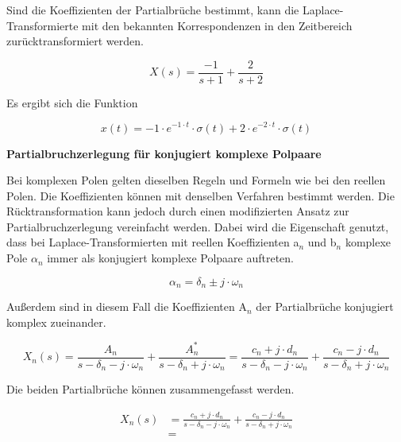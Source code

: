 \noindent Sind die Koeffizienten der Partialbrüche bestimmt, kann die Laplace-Transformierte mit den bekannten Korrespondenzen in den Zeitbereich zurücktransformiert werden.

\begin{equation}\label{eq:fourhundredstwentyseven}
X\left(s\right)=\frac{-1}{s+1} +\frac{2}{s+2} 
\end{equation}

\noindent Es ergibt sich die Funktion

\begin{equation}\label{eq:fourhundredstwentyeight}
x\left(t\right)=-1\cdot e^{-1\cdot t} \cdot \sigma \left(t\right)+2\cdot e^{-2\cdot t} \cdot \sigma \left(t\right)
\end{equation}
\clearpage

{\selectfont
\noindent\textbf{Partialbruchzerlegung für konjugiert komplexe Polpaare}}\smallskip

\noindent Bei komplexen Polen gelten dieselben Regeln und Formeln wie bei den reellen Polen. Die Koeffizienten können mit denselben Verfahren bestimmt werden. Die Rücktransformation kann jedoch durch einen modifizierten Ansatz zur Partialbruchzerlegung vereinfacht werden. Dabei wird die Eigenschaft genutzt, dass bei Laplace-Transformierten mit reellen Koeffizienten a$_{n}$ und b$_{n}$ komplexe Pole $\alpha_{n}$ immer als konjugiert komplexe Polpaare auftreten. 

\begin{equation}\label{eq:fourhundredstwentynine}
\alpha _{n} =\delta _{n} \pm j\cdot \omega _{n}
\end{equation}

\noindent Au{\ss}erdem sind in diesem Fall die Koeffizienten A${}_{n}$ der Partialbr\"{u}che konjugiert komplex zueinander.

\begin{equation}\label{eq:fourhundredsthirty}
X_{n} \left(s\right)=\frac{A_{n} }{s-\delta _{n} -j\cdot \omega _{n} } +\frac{A_{n}^{*} }{s-\delta _{n} +j\cdot \omega _{n} } =\frac{c_{n} +j\cdot d_{n} }{s-\delta _{n} -j\cdot \omega _{n} } +\frac{c_{n} -j\cdot d_{n} }{s-\delta _{n} +j\cdot \omega _{n} }
\end{equation}

\noindent Die beiden Partialbr\"{u}che k\"{o}nnen zusammengefasst werden. 

\begin{equation}\label{eq:fourhundredsthirtyone}
\begin{split}
X_{n} \left(s\right) & =\frac{c_{n} +j\cdot d_{n} }{s-\delta _{n} -j\cdot \omega _{n} } +\frac{c_{n} -j\cdot d_{n} }{s-\delta _{n} +j\cdot \omega _{n} }\\
& =
\end{split}
\end{equation}

